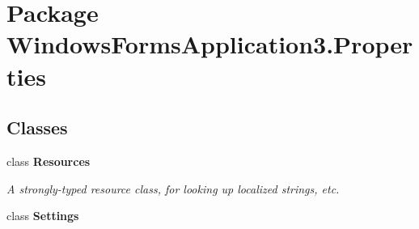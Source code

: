 \hypertarget{namespace_windows_forms_application3_1_1_properties}{}\section{Package Windows\+Forms\+Application3.\+Properties}
\label{namespace_windows_forms_application3_1_1_properties}
\subsection*{Classes}
\begin{DoxyCompactItemize}
\item 
class {\bfseries Resources}
\begin{DoxyCompactList}\small\item\em A strongly-\/typed resource class, for looking up localized strings, etc. \end{DoxyCompactList}\item 
class {\bfseries Settings}
\end{DoxyCompactItemize}
